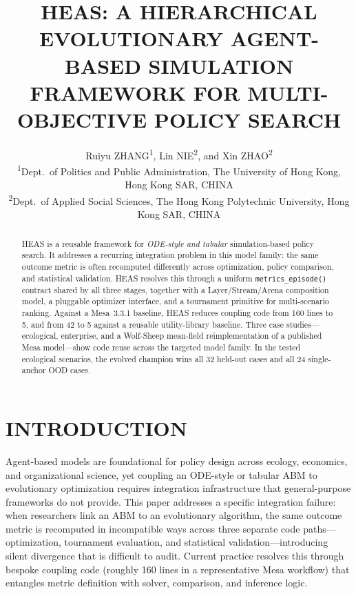 \documentclass{wscpaperproc}
\begin{document}

\title{HEAS: A HIERARCHICAL EVOLUTIONARY AGENT-BASED SIMULATION FRAMEWORK
       FOR MULTI-OBJECTIVE POLICY SEARCH}

\author{\begin{center}Ruiyu ZHANG\textsuperscript{1}, Lin NIE\textsuperscript{2}, and Xin ZHAO\textsuperscript{2}\\
[11pt]
\textsuperscript{1}Dept.~of Politics and Public Administration, The University of Hong Kong, Hong Kong SAR, CHINA\\
\textsuperscript{2}Dept.~of Applied Social Sciences, The Hong Kong Polytechnic University, Hong Kong SAR, CHINA\end{center}
}

\maketitle

\vspace{-12pt}

\begin{abstract}
HEAS is a reusable framework for \emph{ODE-style and tabular} simulation-based
policy search. It addresses a recurring integration problem in this model
family: the same outcome metric is often recomputed differently across
optimization, policy comparison, and statistical validation. HEAS resolves this
through a uniform \texttt{metrics\_episode()} contract shared by all three
stages, together with a Layer/Stream/Arena composition model, a pluggable
optimizer interface, and a tournament primitive for multi-scenario ranking.
Against a Mesa~3.3.1 baseline, HEAS reduces coupling code from 160 lines to 5,
and from 42 to 5 against a reusable utility-library baseline. Three case
studies---ecological, enterprise, and a Wolf-Sheep mean-field reimplementation
of a published Mesa model---show code reuse across the targeted model family.
In the tested ecological scenarios, the evolved champion wins all 32 held-out
cases and all 24 single-anchor OOD cases.
\end{abstract}

\section{INTRODUCTION}

Agent-based models are foundational for policy design across ecology,
economics, and organizational science, yet coupling an ODE-style or tabular ABM
to evolutionary optimization requires integration infrastructure that
general-purpose frameworks do not provide. This paper addresses a specific
integration failure: when researchers link an ABM to an evolutionary algorithm,
the same outcome metric is recomputed in incompatible ways across three separate
code paths---optimization, tournament evaluation, and statistical
validation---introducing silent divergence that is difficult to audit. Current
practice resolves this through bespoke coupling code (roughly 160 lines in a
representative Mesa workflow) that entangles metric definition with solver,
comparison, and inference logic.
\end{document}
